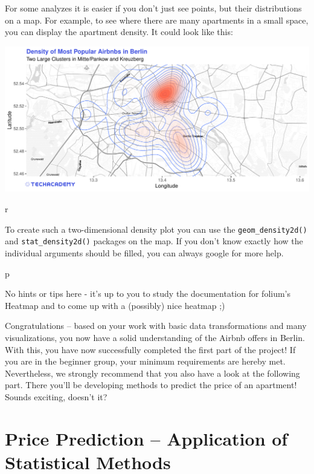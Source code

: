 \documentclass[
  11pt,
]{book}
\begin{document}
For some analyzes it is easier if you don't just see points, but their
distributions on a map. For example, to see where there are many
apartments in a small space, you can display the apartment density. It
could look like this:

\begin{center}\includegraphics[width=1\linewidth]{plot/4_3_map_top200_density} \end{center}

\begin{tips}r

To create such a two-dimensional density plot you can use the
\texttt{geom\_density2d()} and \texttt{stat\_density2d()} packages on
the map. If you don't know exactly how the individual arguments should
be filled, you can always google for more help.

\end{tips}

\begin{tipsp}p

No hints or tips here - it's up to you to study the documentation for
folium's Heatmap and to come up with a (possibly) nice heatmap ;)

\end{tipsp}

Congratulations -- based on your work with basic data transformations
and many visualizations, you now have a solid understanding of the
Airbnb offers in Berlin. With this, you have now successfully completed
the first part of the project! If you are in the beginner group, your
minimum requirements are hereby met. Nevertheless, we strongly recommend
that you also have a look at the following part. There you'll be
developing methods to predict the price of an apartment! Sounds
exciting, doesn't it?

\newpage

\hypertarget{price-prediction-application-of-statistical-methods}{%
\chapter{Price Prediction -- Application of Statistical
Methods}\label{price-prediction-application-of-statistical-methods}}
\end{document}
